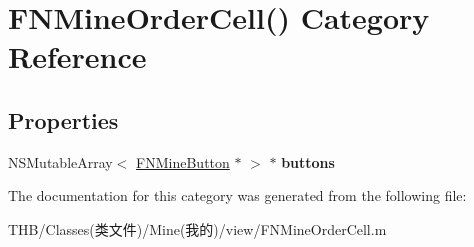 \hypertarget{category_f_n_mine_order_cell_07_08}{}\section{F\+N\+Mine\+Order\+Cell() Category Reference}
\label{category_f_n_mine_order_cell_07_08}
\subsection*{Properties}
\begin{DoxyCompactItemize}
\item 
\mbox{\label{category_f_n_mine_order_cell_07_08_a520101a5ae07bb5c4ff793e82d9558b2}} 
N\+S\+Mutable\+Array$<$ \mbox{\hyperlink{interface_f_n_mine_button}{F\+N\+Mine\+Button}} $\ast$ $>$ $\ast$ {\bfseries buttons}
\end{DoxyCompactItemize}


The documentation for this category was generated from the following file\+:\begin{DoxyCompactItemize}
\item 
T\+H\+B/\+Classes(类文件)/\+Mine(我的)/view/F\+N\+Mine\+Order\+Cell.\+m\end{DoxyCompactItemize}
